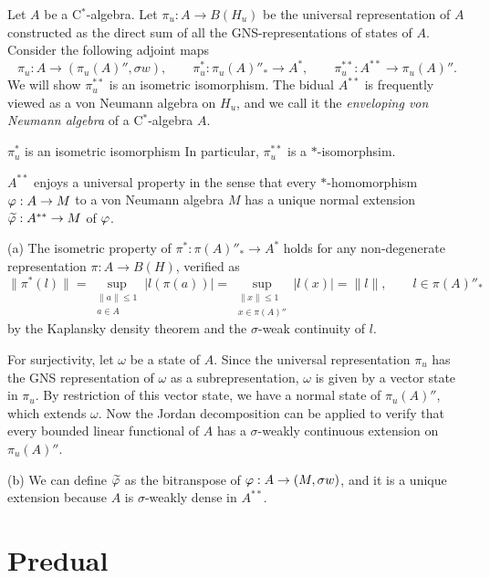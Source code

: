 \documentclass{../../large}
\begin{document}
\begin{prb}
Let $A$ be a C$^*$-algebra.
Let $\pi_u:A\to B(H_u)$ be the universal representation of $A$ constructed as the direct sum of all the GNS-representations of states of $A$.
Consider the following adjoint maps
\[\pi_u:A\to(\pi_u(A)'',\sigma w),\qquad\pi_u^*:\pi_u(A)''_*\to A^*,\qquad\pi_u^{**}:A^{**}\to\pi_u(A)''.\]
We will show $\pi_u^{**}$ is an isometric isomorphism.
The bidual $A^{**}$ is frequently viewed as a von Neumann algebra on $H_u$, and we call it the \emph{enveloping von Neumann algebra} of a C$^*$-algebra $A$.
\begin{parts}
\item $\pi_u^*$ is an isometric isomorphism
In particular, $\pi_u^{**}$ is a $*$-isomorphsim.
\item $A^{**}$ enjoys a universal property in the sense that every $*$-homomorphism $\varphi:A\to M$ to a von Neumann algebra $M$ has a unique normal extension $\widetilde{\varphi}:A^{**}\to M$ of $\varphi$.
\end{parts}
\end{prb}
\begin{pf}
(a)
The isometric property of $\pi^*:\pi(A)''_*\to A^*$ holds for any non-degenerate representation $\pi:A\to B(H)$, verified as
\[\|\pi^*(l)\|=\sup_{\substack{\|a\|\le1\\a\in A}}|l(\pi(a))|=\sup_{\substack{\|x\|\le1\\x\in\pi(A)''}}|l(x)|=\|l\|,\qquad l\in\pi(A)''_*\]
by the Kaplansky density theorem and the $\sigma$-weak continuity of $l$.

For surjectivity, let $\omega$ be a state of $A$.
Since the universal representation $\pi_u$ has the GNS representation of $\omega$ as a subrepresentation, $\omega$ is given by a vector state in $\pi_u$.
By restriction of this vector state, we have a normal state of $\pi_u(A)''$, which extends $\omega$.
Now the Jordan decomposition can be applied to verify that every bounded linear functional of $A$ has a $\sigma$-weakly continuous extension on $\pi_u(A)''$.

(b)
We can define $\widetilde{\varphi}$ as the bitranspose of $\varphi:A\to(M,\sigma w)$, and it is a unique extension because $A$ is $\sigma$-weakly dense in $A^{**}$.
\end{pf}




\section{Predual}
\end{document}
